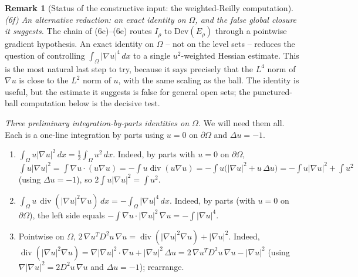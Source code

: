 \documentclass[11pt]{amsart}
\theoremstyle{definition}
\newtheorem{remark}[theorem]{Remark}
\newcommand{\Om}{\Omega}
\begin{document}
\begin{remark}[Status of the constructive input: the weighted-Reilly computation]
\medskip
\emph{(6f) An alternative reduction: an exact identity on \(\Om\), and the
false global closure it suggests.}
The chain of (6c)--(6e) routes \(I_\rho\) to \(\mathrm{Dev}(E_\rho)\) through a
pointwise gradient hypothesis.  An exact identity on \(\Om\) -- not on the
level sets -- reduces the question of controlling
\(\int_\Om|\nabla u|^4\,dx\) to a single \(u^2\)-weighted Hessian estimate.  This
is the most natural last step to try, because it says precisely that the
\(L^4\) norm of \(\nabla u\) is close to the \(L^2\) norm of \(u\), with the
same scaling as the ball.  The identity is useful, but the estimate it suggests
is false for general open sets; the punctured-ball computation below is the
decisive test.

\emph{Three preliminary integration-by-parts identities on \(\Om\).}
We will need them all.  Each is a one-line integration by parts using
\(u=0\) on \(\partial\Om\) and \(\Delta u=-1\).
\begin{enumerate}[leftmargin=2.4em,label=\textup{(\Alph*)}]
\item \(\displaystyle\int_{\Om}u|\nabla u|^2\,dx=\tfrac12\!\int_{\Om}u^2\,dx\).
Indeed, by parts with \(u=0\) on \(\partial\Om\),
\(\int u|\nabla u|^2=\int\nabla u\cdot(u\nabla u)
=-\int u\operatorname{div}(u\nabla u)
=-\int u\bigl(|\nabla u|^2+u\,\Delta u\bigr)
=-\int u|\nabla u|^2+\int u^2\) (using \(\Delta u=-1\)), so
\(2\int u|\nabla u|^2=\int u^2\).
\item \(\displaystyle\int_{\Om}u\,\operatorname{div}(|\nabla u|^2\nabla u)\,dx
=-\int_{\Om}|\nabla u|^4\,dx\).  Indeed, by parts (with \(u=0\) on
\(\partial\Om\)), the left side equals
\(-\int\nabla u\cdot|\nabla u|^2\,\nabla u=-\int|\nabla u|^4\).
\item Pointwise on \(\Om\),
\(2\,\nabla u^TD^2u\,\nabla u
=\operatorname{div}(|\nabla u|^2\nabla u)+|\nabla u|^2\).  Indeed,
\(\operatorname{div}(|\nabla u|^2\nabla u)
=\nabla|\nabla u|^2\cdot\nabla u+|\nabla u|^2\,\Delta u
=2\,\nabla u^T D^2u\,\nabla u-|\nabla u|^2\) (using
\(\nabla|\nabla u|^2=2D^2u\,\nabla u\) and \(\Delta u=-1\)); rearrange.
\end{enumerate}


\end{remark}
\end{document}
